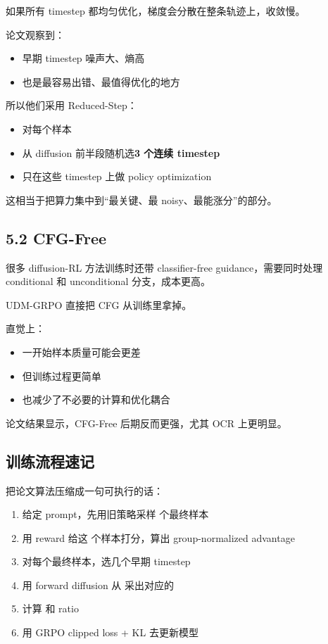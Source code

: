 如果所有 timestep 都均匀优化，梯度会分散在整条轨迹上，收敛慢。

论文观察到：

\begin{itemize}[leftmargin=1.5em]
  \item 早期 timestep 噪声大、熵高
  \item 也是最容易出错、最值得优化的地方
\end{itemize}

所以他们采用 Reduced-Step：

\begin{itemize}[leftmargin=1.5em]
  \item 对每个样本
  \item 从 diffusion 前半段随机选\textbf{3 个连续 timestep}
  \item 只在这些 timestep 上做 policy optimization
\end{itemize}

这相当于把算力集中到“最关键、最 noisy、最能涨分”的部分。

\subsection{5.2 CFG-Free}

很多 diffusion-RL 方法训练时还带 classifier-free guidance，需要同时处理 conditional 和 unconditional 分支，成本更高。

UDM-GRPO 直接把 CFG 从训练里拿掉。

直觉上：

\begin{itemize}[leftmargin=1.5em]
  \item 一开始样本质量可能会更差
  \item 但训练过程更简单
  \item 也减少了不必要的计算和优化耦合
\end{itemize}

论文结果显示，CFG-Free 后期反而更强，尤其 OCR 上更明显。

\subsection{训练流程速记}

把论文算法压缩成一句可执行的话：

\begin{enumerate}[leftmargin=1.5em]
  \item 给定 prompt，先用旧策略采样  个最终样本 
  \item 用 reward 给这  个样本打分，算出 group-normalized advantage
  \item 对每个最终样本，选几个早期 timestep
  \item 用 forward diffusion 从  采出对应的 
  \item 计算  和 ratio
  \item 用 GRPO clipped loss + KL 去更新模型
\end{enumerate}

